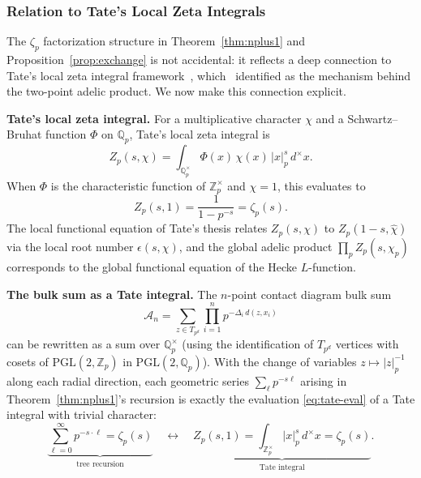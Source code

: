 \documentclass[11pt,a4paper]{article}
\newcommand{\Qp}{\mathbb{Q}_p}
\newcommand{\Zp}{\mathbb{Z}_p}
\newcommand{\PGL}{\mathrm{PGL}}
\newcommand{\normp}[1]{|#1|_p}
\begin{document}
\subsubsection{Relation to Tate's Local Zeta Integrals}
\label{sec:tate-relation}

The $\zeta_p$ factorization structure in Theorem~\ref{thm:nplus1} and Proposition~\ref{prop:exchange} is not accidental: it reflects a deep connection to Tate's local zeta integral framework~\cite{Tate50}, which~\cite{HSYZ20} identified as the mechanism behind the two-point adelic product. We now make this connection explicit.

\textbf{Tate's local zeta integral.} For a multiplicative character $\chi$ and a Schwartz--Bruhat function $\Phi$ on $\Qp$, Tate's local zeta integral is
\begin{equation}
\label{eq:tate-integral}
Z_p(s, \chi) = \int_{\Qp^\times} \Phi(x)\, \chi(x)\, \normp{x}^s\, d^\times x.
\end{equation}
When $\Phi$ is the characteristic function of $\Zp^\times$ and $\chi = 1$, this evaluates to
\begin{equation}
\label{eq:tate-eval}
Z_p(s, 1) = \frac{1}{1 - p^{-s}} = \zeta_p(s).
\end{equation}
The local functional equation of Tate's thesis relates $Z_p(s, \chi)$ to $Z_p(1-s, \hat{\chi})$ via the local root number $\epsilon(s, \chi)$, and the global adelic product $\prod_p Z_p(s, \chi_p)$ corresponds to the global functional equation of the Hecke $L$-function.

\textbf{The bulk sum as a Tate integral.} The $n$-point contact diagram bulk sum
\begin{equation}
\mathcal{A}_n = \sum_{z \in T_{p^d}} \prod_{i=1}^n p^{-\Delta_i\, d(z, x_i)}
\end{equation}
can be rewritten as a sum over $\Qp^\times$ (using the identification of $T_{p^d}$ vertices with cosets of $\PGL(2, \Zp)$ in $\PGL(2, \Qp)$). With the change of variables $z \mapsto \normp{z}^{-1}$ along each radial direction, each geometric series $\sum_\ell p^{-s\ell}$ arising in Theorem~\ref{thm:nplus1}'s recursion is exactly the evaluation \eqref{eq:tate-eval} of a Tate integral with trivial character:
\begin{equation}
\label{eq:tate-identification}
\underbrace{\sum_{\ell=0}^\infty p^{-s \cdot \ell} = \zeta_p(s)}_{\text{tree recursion}} \quad \longleftrightarrow \quad \underbrace{Z_p(s, 1) = \int_{\Zp^\times} \normp{x}^s\, d^\times x = \zeta_p(s)}_{\text{Tate integral}}.
\end{equation}
\end{document}
